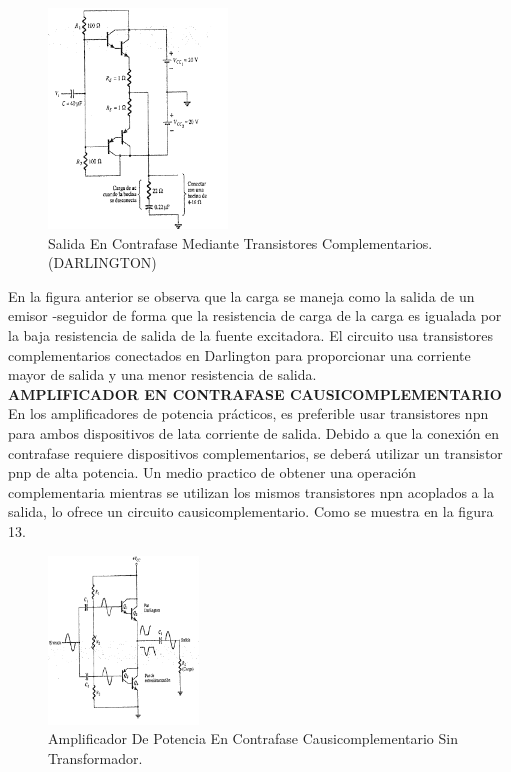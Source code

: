 \documentclass[10pt,a4paper]{article}
\begin{document}
\begin{center}
\begin{figure}[hbtp]
\centering
\includegraphics[scale=0.5]{24.png}
\caption{Salida En Contrafase Mediante Transistores Complementarios. (DARLINGTON)}
\end{figure}
\end{center}
En la figura anterior se observa que la carga se maneja como la salida de un emisor -seguidor de forma que la resistencia de carga de la carga es igualada por la baja resistencia de salida de la fuente excitadora. El circuito usa transistores complementarios conectados en Darlington para proporcionar una corriente mayor de salida y una menor resistencia de salida.\\
\textbf{AMPLIFICADOR EN CONTRAFASE CAUSICOMPLEMENTARIO}\\
En los amplificadores de potencia prácticos, es preferible usar transistores npn para ambos dispositivos de lata corriente de salida. Debido a que la conexión en contrafase requiere dispositivos complementarios, se deberá utilizar un transistor pnp de alta potencia. Un medio practico de obtener una operación complementaria mientras se utilizan los mismos transistores npn acoplados a la salida, lo ofrece un circuito causicomplementario. Como se muestra en la figura 13.
\begin{center}
\begin{figure}[hbtp]
\centering
\includegraphics[scale=0.5]{25.png}
\caption{Amplificador De Potencia En Contrafase Causicomplementario Sin Transformador.}
\end{figure}
\end{center}
\end{document}
